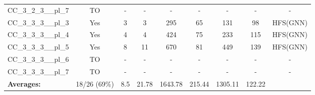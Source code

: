 \documentclass{article}
\begin{document}
\begin{tabular}{lcccccccc}
CC\_3\_2\_3\_\_pl\_7 & TO & - & - & - & - & - & - & - \\
CC\_3\_3\_3\_\_pl\_3 & Yes & 3 & 3 & 295 & 65 & 131 & 98 & HFS(GNN) \\
CC\_3\_3\_3\_\_pl\_4 & Yes & 4 & 4 & 424 & 75 & 233 & 115 & HFS(GNN) \\
CC\_3\_3\_3\_\_pl\_5 & Yes & 8 & 11 & 670 & 81 & 449 & 139 & HFS(GNN) \\
CC\_3\_3\_3\_\_pl\_6 & TO & - & - & - & - & - & - & - \\
CC\_3\_3\_3\_\_pl\_7 & TO & - & - & - & - & - & - & - \\
\textbf{Averages:} & 18/26 (69\%) & 8.5 & 21.78 & 1643.78 & 215.44 & 1305.11 & 122.22 & \\
\bottomrule
\end{tabular}
\\[0.7cm]
\end{document}
